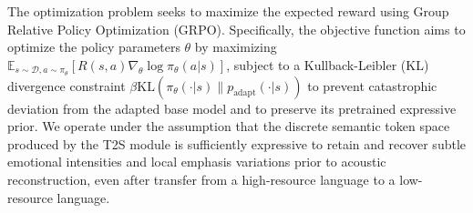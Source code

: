 The optimization problem seeks to maximize the expected reward using Group Relative Policy Optimization (GRPO). Specifically, the objective function aims to optimize the policy parameters $\theta$ by maximizing $\mathbb{E}_{s \sim \mathcal{D}, a \sim \pi_\theta} [ R(s, a) \nabla_\theta \log \pi_\theta(a|s) ]$, subject to a Kullback-Leibler (KL) divergence constraint $\beta \text{KL}(\pi_\theta(\cdot|s) \| p_{\text{adapt}}(\cdot|s))$ to prevent catastrophic deviation from the adapted base model and to preserve its pretrained expressive prior. We operate under the assumption that the discrete semantic token space produced by the T2S module is sufficiently expressive to retain and recover subtle emotional intensities and local emphasis variations prior to acoustic reconstruction, even after transfer from a high-resource language to a low-resource language.
